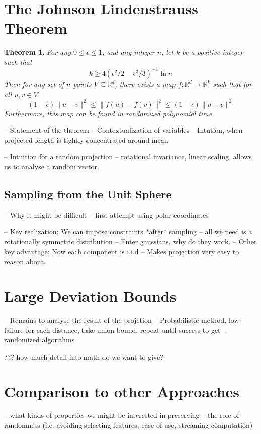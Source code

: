 \documentclass[11pt]{article}
\newcommand{\arr}{\rightarrow}
\newcommand{\R}{\mathbb{R}}
\newtheorem{Thm}{Theorem}
\begin{document}
\section{The Johnson Lindenstrauss Theorem}
\begin{Thm}
    For any $0 \leq \epsilon \leq 1$, and any integer $n$, let $k$ be a positive integer such that
    \[ k \geq 4(\epsilon^2/2 - \epsilon^3/3)^{-1} \ln n \]
    Then for any set of $n$ points $V \subseteq \R^d$, there exists a map $f:\R^d \arr \R^k$ such that for all $u, v \in V$
    \[(1-\epsilon)\|u - v\|^2 \leq \| f(u) - f(v) \|^2 \leq (1+\epsilon) \| u - v \|^2 \]
    Furthermore, this map can be found in randomized polynomial time.
\end{Thm}
-- Statement of the theorem
-- Contextualization of variables
-- Intution, when projected length is tightly concentrated around mean

-- Intuition for a random projection
-- rotational invariance, linear scaling, allows us to analyse a random vector.

\subsection{Sampling from the Unit Sphere}
-- Why it might be difficult
-- first attempt using polar coordinates

-- Key realization: We can impose constraints *after* sampling
   -- all we need is a rotationally symmetric distribution
-- Enter gaussians, why do they work.
-- Other key advantage: Now each component is i.i.d
    -- Makes projection very easy to reason about.

\section{Large Deviation Bounds}
-- Remains to analyse the result of the projetion
-- Probabilistic method, low failure for each distance, take union bound, repeat until success to get
-- randomized algorithms

??? how much detail into math do we want to give?


\section{Comparison to other Approaches}
-- what kinds of properties we might be interested in preserving
-- the role of randomness (i.e. avoiding selecting features, ease of use, streaming computation)
\end{document}
